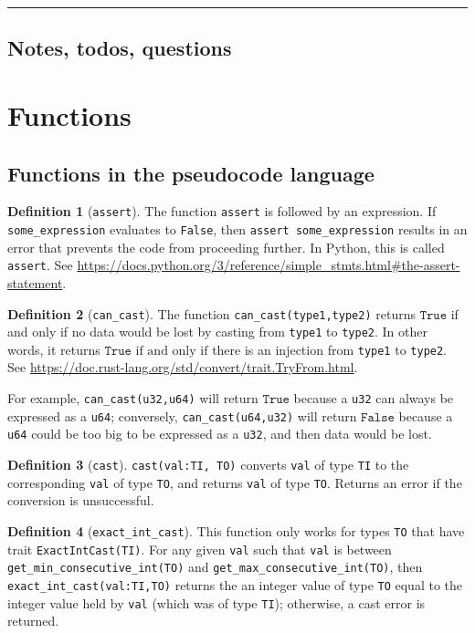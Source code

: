 \documentclass[11pt,a4paper]{article}
\theoremstyle{definition}
\newtheorem{definition}{Definition}[section]
\newcommand{\True}{\texttt{True}}
\newcommand{\False}{\texttt{False}}
\newcommand{\horizline}{\noindent\rule{\textwidth}{1pt}}
\newcommand{\inRust}[2]{See \url{#2}.}
\newcommand{\inPython}[2]{In Python, this is called \texttt{#1}. See \url{#2}.}
\newcommand{\iffText}{\text{if and only if}}
\begin{document}
\horizline

\subsection{Notes, todos, questions}

\section{Functions}

\subsection{Functions in the pseudocode language}

\begin{definition}[\texttt{assert}] 
    The function \texttt{assert} is followed by an expression. If \texttt{some\_expression} evaluates to \texttt{False}, then \texttt{assert some\_expression} results in an error that prevents the code from proceeding further. \inPython{\texttt{assert}}{https://docs.python.org/3/reference/simple_stmts.html\#the-assert-statement}
\end{definition}

\begin{definition}[\texttt{can\_cast}]
    The function \texttt{can\_cast(type1,type2)} returns $\True$ if and only if no data would be lost by casting from \texttt{type1} to \texttt{type2}. In other words, it returns $\True$ $\iffText$ there is an injection from \texttt{type1} to \texttt{type2}. \inRust{std::convert::TryFrom}{https://doc.rust-lang.org/std/convert/trait.TryFrom.html}
\end{definition}

For example, \texttt{can\_cast(u32,u64)} will return $\True$ because a \texttt{u32} can always be expressed as a \texttt{u64}; conversely, \texttt{can\_cast(u64,u32)} will return $\False$ because a \texttt{u64} could be too big to be expressed as a \texttt{u32}, and then data would be lost.

\begin{definition}[\texttt{cast}]
    \texttt{cast(val:TI, TO)} converts \texttt{val} of type \texttt{TI} to the corresponding \texttt{val} of type \texttt{TO}, and returns \texttt{val} of type \texttt{TO}. Returns an error if the conversion is unsuccessful.
\end{definition}

\begin{definition}[\texttt{exact\_int\_cast}]
    This function only works for types \texttt{TO} that have trait \texttt{ExactIntCast(TI)}. For any given \texttt{val} such that \texttt{val} is between \texttt{get\_min\_consecutive\_int(TO)} and \texttt{get\_max\_consecutive\_int(TO)}, then \texttt{exact\_int\_cast(val:TI,TO)} returns the an integer value of type \texttt{TO} equal to the integer value held by  \texttt{val} (which was of type \texttt{TI}); otherwise, a cast error is returned.
\end{definition}
\end{document}
